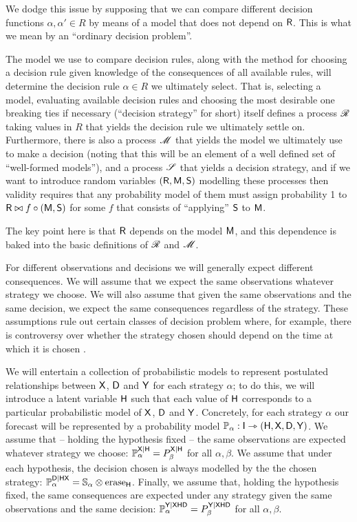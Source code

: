 We dodge this issue by supposing that we can compare different decision functions $\alpha,\alpha'\in R$ by means of a model that does not depend on $\mathsf{R}$. This is what we mean by an ``ordinary decision problem''.

The model we use to compare decision rules, along with the method for choosing a decision rule given knowledge of the consequences of all available rules, will determine the decision rule $\alpha\in R$ we ultimately select. That is, selecting a model, evaluating available decision rules and choosing the most desirable one breaking ties if necessary (``decision strategy'' for short) itself defines a process $\mathscr{R}$ taking values in $R$ that yields the decision rule we ultimately settle on. Furthermore, there is also a process $\mathscr{M}$ that yields the model we ultimately use to make a decision (noting that this will be an element of a well defined set of ``well-formed models''), and a process $\mathscr{S}$ that yields a decision strategy, and if we want to introduce random variables $(\mathsf{R},\mathsf{M},\mathsf{S})$ modelling these processes then validity requires that any probability model of them must assign probability 1 to $\mathsf{R}\bowtie f\circ(\mathsf{M},\mathsf{S})$ for some $f$ that consists of ``applying'' $\mathsf{S}$ to $\mathsf{M}$.

The key point here is that $\mathsf{R}$ depends on the model $\mathsf{M}$, and this dependence is baked into the basic definitions of $\mathscr{R}$ and $\mathscr{M}$.



For different observations and decisions we will generally expect different consequences. We will assume that we expect the same observations whatever strategy we choose. We will also assume that given the same observations and the same decision, we expect the same consequences regardless of the strategy. These assumptions rule out certain classes of decision problem where, for example, there is controversy over whether the strategy chosen should depend on the time at which it is chosen \citet{weirich_causal_2016,lewis_causal_1981,paul_f_christiano_edt_2018}.

We will entertain a collection of probabilistic models to represent postulated relationships between $\mathsf{X}$, $\mathsf{D}$ and $\mathsf{Y}$ for each strategy $\alpha$; to do this, we will introduce a latent variable $\mathsf{H}$ such that each value of $\mathsf{H}$ corresponds to a particular probabilistic model of $\mathsf{X}$, $\mathsf{D}$ and $\mathsf{Y}$. Concretely, for each strategy $\alpha$ our forecast will be represented by a probability model $\mathbb{P}_{\alpha}:\mathsf{I}\rightarrowtriangle (\mathsf{H},\mathsf{X},\mathsf{D},\mathsf{Y})$. We assume that -- holding the hypothesis fixed -- the same observations are expected whatever strategy we choose: $\mathbb{P}_{\alpha}^{\mathsf{X}|\mathsf{H}}=P_{\beta}^{\mathsf{X}|\mathsf{H}}$ for all $\alpha,\beta$. We assume that under each hypothesis, the decision chosen is always modelled by the the chosen strategy: $\mathbb{P}_{\alpha}^{\mathsf{D}|\mathsf{HX}}=\mathbb{S}_\alpha \otimes \text{erase}_{\mathsf{H}}$. Finally, we assume that, holding the hypothesis fixed, the same consequences are expected under any strategy given the same observations and the same decision: $\mathbb{P}_{\alpha}^{\mathsf{Y}|\mathsf{XHD}}=P_{\beta}^{\mathsf{Y}|\mathsf{XHD}}$ for all $\alpha,\beta$.

